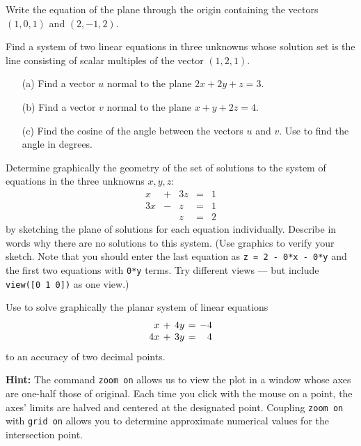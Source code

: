 \begin{exercise} \label{c2.2.7}
Write the equation of the plane through the origin containing the
vectors $(1,0,1)$ and $(2,-1,2)$.
\end{exercise}

\begin{exercise} \label{c2.2.8}
Find a system of two linear equations in three
unknowns whose solution set is the line consisting of scalar
multiples of the vector $(1,2,1)$.
\end{exercise}

\begin{exercise} \label{c2.2.9}
\begin{itemize}
\item[(a)] Find a vector $u$ normal to the plane $2x+2y+z=3$.
\item[(b)] Find a vector $v$ normal to the plane $x+y+2z=4$.
\item[(c)] Find the cosine of the angle between the vectors $u$ and $v$.
Use \Matlab to find the angle in degrees.
\end{itemize}
\end{exercise}

\begin{exercise} \label{c2.2.10}
Determine graphically the geometry of the set of solutions to the
system of equations in the three unknowns $x,y,z$:
\[
\begin{array}{rcrcr}
  x & + & 3z  & = & 1\\
 3x & - &  z  & = & 1\\
    &   &  z  & = & 2
\end{array}
\]
by sketching the plane of solutions for each equation individually.
Describe in words why there are no solutions to this system.
(Use \Matlab graphics to verify your sketch.  Note that you should
enter the last equation as {\tt z = 2 - 0*x - 0*y} and the first two
equations with {\tt 0*y} terms.  Try different views --- but include
{\tt view([0 1 0])} as one view.)
\end{exercise}

\CEXER

\begin{exercise} \label{c2.2.1}
Use \Matlab to solve graphically the planar system of linear
equations
\[
\arraycolsep 2pt
\begin{array}{rcrcr}
 x & + & 4y & = & -4 \\
4x & + & 3y & = &  4
\end{array}
\]
to an accuracy of two decimal points.

{\bf Hint:} The \Matlab command {\tt zoom on}
allows us to
view the plot in a window whose axes are one-half those of
original.  Each time you click with the mouse on a point,
the axes' limits are halved and centered at the designated
point. Coupling {\tt zoom on} with {\tt grid on} allows you
to determine approximate numerical values for the intersection
point.
\end{exercise}

